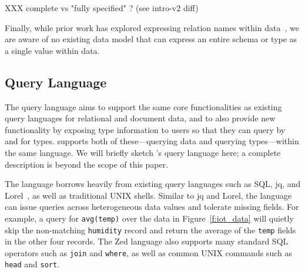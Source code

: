 XXX complete vs "fully specified" ?  (see intro-v2 diff)

Finally, while prior work has explored expressing relation names within data~, we are aware of no existing data model that can express an entire schema or type as a single value within data.

\subsection{\sys{} Query Language} \label{ss:zed_query_language}

The \sys{} query language aims to support the same core functionalities as existing query languages for relational and document data, and to also provide new functionality by exposing type information to users so that they can query by and for types. \sys{} supports both of these---querying data and querying types---within the same language. We will briefly sketch \sys{}'s query language here; a complete description is beyond the scope of this paper.

The \sys{} language borrows heavily from existing query languages such as SQL, jq, and Lorel~, as well as traditional UNIX shells. Similar to jq and Lorel, the \sys{} language can issue queries across heterogeneous data values and tolerate missing fields. For example, a query for \texttt{avg(temp)} over the data in Figure~\ref{f:iot_data} will quietly skip the non-matching \texttt{humidity} record and return the average of the \texttt{temp} fields in the other four records. The Zed language also supports many standard SQL operators such as \texttt{join} and \texttt{where}, as well as common UNIX commands such as \texttt{head} and \texttt{sort}.

